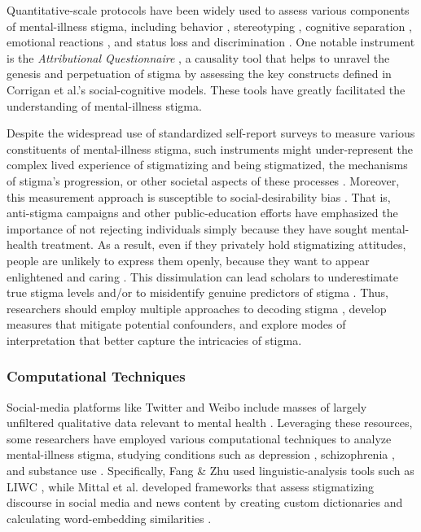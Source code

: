 Quantitative-scale protocols have been widely used to assess various components of mental-illness stigma, including behavior \cite{vignette_link_1987}, stereotyping \cite{stereotyping_bedini_2000}, cognitive separation \cite{cognitive_ostma_2002}, emotional reactions \cite{affective_vezzoli_2001}, and status loss and discrimination \cite{status_loss_secker_1999}. 
One notable instrument is the \textit{Attributional Questionnaire} \cite{attribution_model_corrigan_2003}, a causality tool that helps to unravel the genesis and perpetuation of stigma by assessing the key constructs defined in Corrigan et al.'s \cite{attribution_theory_corrigan_2000} social-cognitive models.
These tools have greatly facilitated the understanding of mental-illness stigma.


Despite the widespread use of standardized self-report surveys to measure various constituents of mental-illness stigma, such instruments might under-represent the complex lived experience of stigmatizing and being stigmatized, the mechanisms of stigma's progression, or other societal aspects of these processes \cite{interview_stigma_measure_liggins_2005}. 
Moreover, this measurement approach is susceptible to social-desirability bias \cite{vignette_link_1987}. 
That is, anti-stigma campaigns \cite{campaign_corrigan_2001} and other public-education efforts \cite{intervention_corrigan_1999} have emphasized the importance of not rejecting individuals simply because they have sought mental-health treatment. 
As a result, even if they privately hold stigmatizing attitudes, people are unlikely to express them openly, because they want to appear enlightened and caring \cite{sd_scale_inaccurate_van_2008}. 
This dissimulation can lead scholars to underestimate true stigma levels and/or to misidentify genuine predictors of stigma \cite{sd_stigma_michaels_2013}. 
Thus, researchers should employ multiple approaches to decoding stigma \cite{vignette_link_2004}, develop measures that mitigate potential confounders, and explore modes of interpretation that better capture the intricacies of stigma.




\subsubsection{Computational Techniques}


Social-media platforms like Twitter and Weibo include masses of largely unfiltered qualitative data relevant to mental health \cite{social_media_bail_2017, social_media_pavlova_2020}. 
Leveraging these resources, some researchers have employed various computational techniques to analyze mental-illness stigma, studying conditions such as depression \cite{detect_method_li_2018}, schizophrenia \cite{detect_method_jilka_2022}, and substance use \cite{detect_method_roesler_2024}.
Specifically, Fang \& Zhu used linguistic-analysis tools such as LIWC \cite{detect_method_fang_2023}, while Mittal et al. developed frameworks that assess stigmatizing discourse in social media and news content by creating custom dictionaries and calculating word-embedding similarities \cite{detect_method_mittal_2023}.




